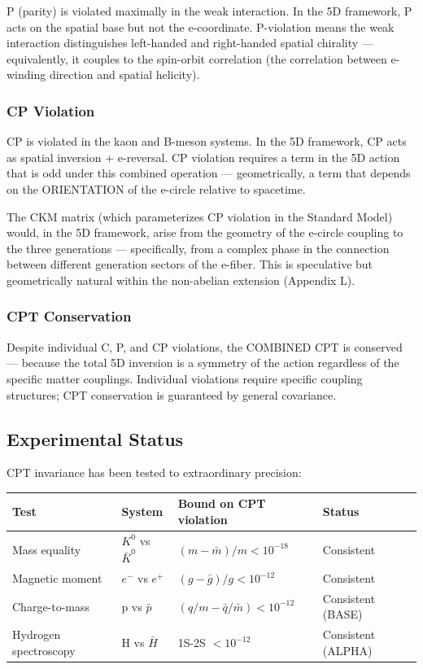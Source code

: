 \documentclass[aps,prd,preprint,superscriptaddress,longbibliography,floatfix]{revtex4-2}
\theoremstyle{remark}
\begin{document}
P (parity) is violated maximally in the weak interaction. In the 5D framework, P acts on the spatial base but not the e-coordinate. P-violation means the weak interaction distinguishes left-handed and right-handed spatial chirality --- equivalently, it couples to the spin-orbit correlation (the correlation between e-winding direction and spatial helicity).


\subsubsection{CP Violation}

CP is violated in the kaon and B-meson systems. In the 5D framework, CP acts as spatial inversion + e-reversal. CP violation requires a term in the 5D action that is odd under this combined operation --- geometrically, a term that depends on the ORIENTATION of the e-circle relative to spacetime.

The CKM matrix (which parameterizes CP violation in the Standard Model) would, in the 5D framework, arise from the geometry of the e-circle coupling to the three generations --- specifically, from a complex phase in the connection between different generation sectors of the e-fiber. This is speculative but geometrically natural within the non-abelian extension (Appendix L).


\subsubsection{CPT Conservation}

Despite individual C, P, and CP violations, the COMBINED CPT is conserved --- because the total 5D inversion is a symmetry of the action regardless of the specific matter couplings. Individual violations require specific coupling structures; CPT conservation is guaranteed by general covariance.



\subsection{Experimental Status}

CPT invariance has been tested to extraordinary precision:


\begin{table}[H]
\begin{ruledtabular}
\begin{tabular}{p{3.8cm}p{3.8cm}p{3.8cm}p{3.8cm}}
Test & System & Bound on CPT violation & Status \\
\hline
Mass equality & $K^{0}$ vs $\bar{K}^{0}$ & $(m - \bar{m})/m < 10^{-18}$ & Consistent \\
Magnetic moment & $e^{-}$ vs $e^{+}$ & $(g - \bar{g})/g < 10^{-12}$ & Consistent \\
Charge-to-mass & p vs \texttt{$\bar{p}$} & $(q/m - \bar{q}/\bar{m}) < 10^{-12}$ & Consistent (BASE) \\
Hydrogen spectroscopy & H vs \texttt{$\bar{H}$} & 1S-2S $< 10^{-12}$ & Consistent (ALPHA) \\
\end{tabular}
\end{ruledtabular}
\end{table}
\end{document}
